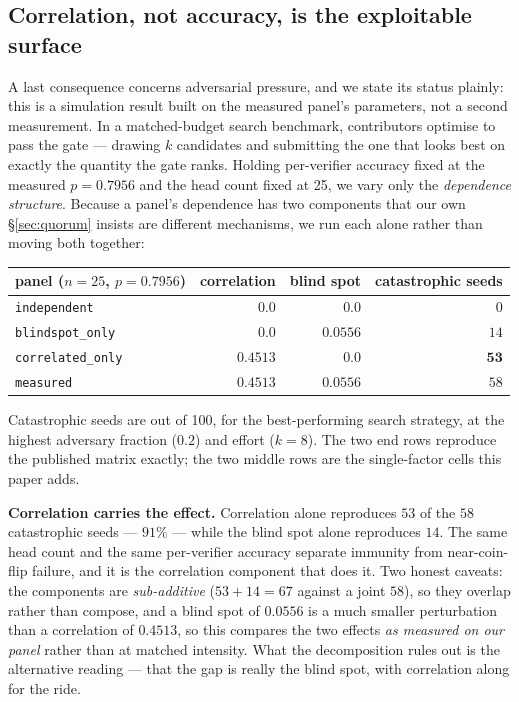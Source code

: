 \documentclass[11pt,a4paper]{article}
\newcommand{\code}[1]{\texttt{#1}}
\begin{document}
\subsection{Correlation, not accuracy, is the exploitable surface}
\label{sec:adversarial}

A last consequence concerns adversarial pressure, and we state its status
plainly: this is a simulation result built on the measured panel's parameters,
not a second measurement. In a matched-budget search benchmark, contributors
optimise to pass the gate --- drawing $k$ candidates and submitting the one that
looks best on exactly the quantity the gate ranks. Holding per-verifier accuracy
fixed at the measured $p = 0.7956$ and the head count fixed at 25, we vary only
the \emph{dependence structure}. Because a panel's dependence has two components
that our own \S\ref{sec:quorum} insists are different mechanisms, we run each
alone rather than moving both together:

\begin{center}
\begin{tabular}{lrrr}
\toprule
panel ($n=25$, $p=0.7956$) & correlation & blind spot & catastrophic seeds \\
\midrule
\code{independent}      & $0.0$    & $0.0$    & $0$ \\
\code{blindspot\_only}  & $0.0$    & $0.0556$ & $14$ \\
\code{correlated\_only} & $0.4513$ & $0.0$    & $\mathbf{53}$ \\
\code{measured}         & $0.4513$ & $0.0556$ & $58$ \\
\bottomrule
\end{tabular}
\end{center}

Catastrophic seeds are out of 100, for the best-performing search strategy, at
the highest adversary fraction ($0.2$) and effort ($k=8$). The two end rows
reproduce the published matrix exactly; the two middle rows are the
single-factor cells this paper adds.

\textbf{Correlation carries the effect.} Correlation alone reproduces $53$ of the
$58$ catastrophic seeds --- $91\%$ --- while the blind spot alone reproduces
$14$. The same head count and the same per-verifier accuracy separate immunity
from near-coin-flip failure, and it is the correlation component that does it.
Two honest caveats: the components are \emph{sub-additive} ($53 + 14 = 67$
against a joint $58$), so they overlap rather than compose, and a blind spot of
$0.0556$ is a much smaller perturbation than a correlation of $0.4513$, so this
compares the two effects \emph{as measured on our panel} rather than at matched
intensity. What the decomposition rules out is the alternative reading --- that
the gap is really the blind spot, with correlation along for the ride.
\end{document}
